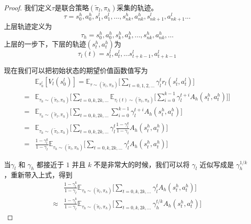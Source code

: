 \begin{proof}
我们定义$\tau$是联合策略$(\tilde\pi_l,\pi_h)$采集的轨迹。
\begin{equation*}
    \tau = s_0^h,a_0^h,s_1^l,a_1^l,...,s_{nk}^h,a_{nk}^h,s_{nk+1}^l,a^l_{nk + 1}...
\end{equation*}
上层轨迹定义为
\begin{equation*}
    \tau_h = s_0^h,a_0^h,s_k^h, a_k^h,...,s_{nk}^h,a_{nk}^h,...
\end{equation*}
上层的一步下，下层的轨迹$(s_t^h,a_t^h)$为
\begin{equation*}
    \tau_l(t) = s_{t}^l,a_{t}^l,...s_{t+k-1}^l,a_{t+k-1}^l
\end{equation*}

现在我们可以把初始状态的期望价值函数值写为
        \begin{align}
            &\mathbb{E}_{s_0^l}[V_l(s_0^l)] = \mathbb{E}_{\tau\sim(\tilde\pi_l,\pi_h)}\Bigg[\sum_{t = 0, 1, 2, ...} \gamma_l^{t} r_l(s_t^l, a_t^l)\Bigg]\\
            =&\mathbb{E}_{\tau_h\sim(\tilde\pi_l,\pi_h)}\Bigg[\sum_{t=0,k,2k,...}\mathbb{E}_{\tau_l(t)\sim(\tilde\pi_l,\pi_h)}\Big[\sum_{i = 0}^{k-1}\gamma_l^{t+i}A_h(s_t^h, a_t^h)\Big]\Bigg]\\
            =&\mathbb{E}_{\tau_h\sim(\tilde\pi_l,\pi_h)}\Bigg[\sum_{t=0,k,2k,...}\sum_{i = 0}^{k-1}\gamma_l^{t+i}A_h(s_t^h, a_t^h)\Bigg]\\
            =&\mathbb{E}_{\tau_h\sim(\tilde\pi_l,\pi_h)}\Bigg[\sum_{t=0,k,2k,...}\gamma_l^t\frac{1-\gamma_l^k}{1-\gamma_l}A_h(s_t^h, a_t^h)\Bigg]\\
            =&\frac{1-\gamma_l^k}{1-\gamma_l}\mathbb{E}_{\tau_h\sim(\tilde\pi_l,\pi_h)}\Bigg[\sum_{t=0,k,2k,...}\gamma_l^tA_h(s_t^h, a_t^h)\Bigg]
        \end{align}
    
    当$\gamma_l$ 和 $\gamma_h$ 都接近于 $1$ 并且 $k$ 不是非常大的时候，我们可以将 $\gamma_l$ 近似写成是 $\gamma_h^{1/k}$，重新带入上式，得到
    \begin{equation}
    \begin{aligned}
        &\frac{1-\gamma_l^k}{1-\gamma_l}\mathbb{E}_{\tau_h\sim(\tilde\pi_l,\pi_h)}\Bigg[\sum_{t=0,k,2k,...}\gamma_l^tA_h(s_t^h, a_t^h)\Bigg]\\
            \approx&\frac{1-\gamma_l^k}{1-\gamma_l}\mathbb{E}_{\tau_h\sim(\tilde\pi_l,\pi_h)}\Bigg[\sum_{t=0,k,2k,...}\gamma_h^{t/k}A_h(s_t^h, a_t^h)\Bigg]
    \end{aligned}
    \end{equation}
\end{proof}
%
%
%
%
%
